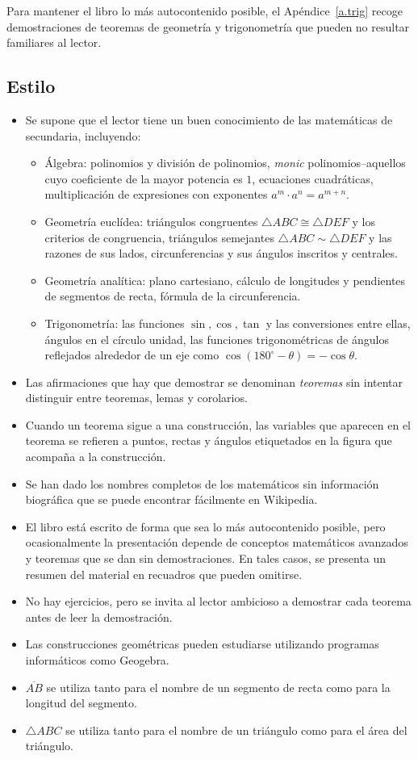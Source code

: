 Para mantener el libro lo más autocontenido posible, el Apéndice~\ref{a.trig} recoge demostraciones de teoremas de geometría y trigonometría que pueden no resultar familiares al lector.

\subsection*{Estilo}

\begin{itemize}
\item Se supone que el lector tiene un buen conocimiento de las matemáticas de secundaria, incluyendo:
\begin{itemize}
\item Álgebra: polinomios y división de polinomios, \emph{monic} polinomios--aquellos cuyo coeficiente de la mayor potencia es $1$, ecuaciones cuadráticas, multiplicación de expresiones con exponentes $a^m\cdot a^n=a^{m+n}$.
\item Geometría euclídea: triángulos congruentes $\triangle ABC \cong \triangle DEF$ y los criterios de congruencia, triángulos semejantes $\triangle ABC \sim \triangle DEF$ y las razones de sus lados, circunferencias y sus ángulos inscritos y centrales.
\item Geometría analítica: plano cartesiano, cálculo de longitudes y pendientes de segmentos de recta, fórmula de la circunferencia.
\item Trigonometría: las funciones $\sin,\cos,\tan$ y las conversiones entre ellas, ángulos en el círculo unidad, las funciones trigonométricas de ángulos reflejados alrededor de un eje como $\cos (180^\circ-\theta)=-\cos\theta$.
\end{itemize}
\item Las afirmaciones que hay que demostrar se denominan \emph{teoremas} sin intentar distinguir entre teoremas, lemas y corolarios.
\item Cuando un teorema sigue a una construcción, las variables que aparecen en el teorema se refieren a puntos, rectas y ángulos etiquetados en la figura que acompaña a la construcción.
\item Se han dado los nombres completos de los matemáticos sin información biográfica que se puede encontrar fácilmente en Wikipedia.
\item El libro está escrito de forma que sea lo más autocontenido posible, pero ocasionalmente la presentación depende de conceptos matemáticos avanzados y teoremas que se dan sin demostraciones. En tales casos, se presenta un resumen del material en recuadros que pueden omitirse.
\item No hay ejercicios, pero se invita al lector ambicioso a demostrar cada teorema antes de leer la demostración.
\item Las construcciones geométricas pueden estudiarse utilizando programas informáticos como Geogebra.
\item $\overline{AB}$ se utiliza tanto para el nombre de un segmento de recta como para la longitud del segmento.
\item $\triangle ABC$ se utiliza tanto para el nombre de un triángulo como para el área del triángulo.
\end{itemize}


